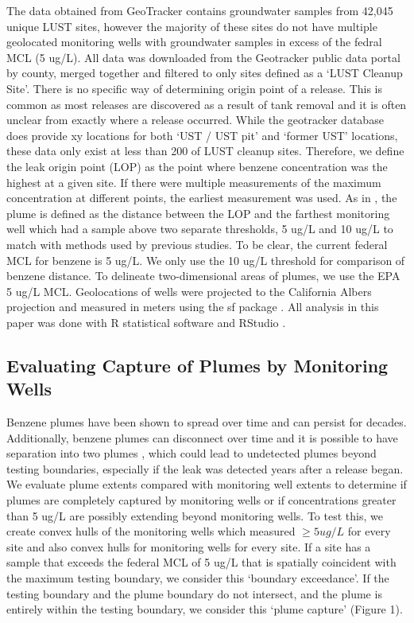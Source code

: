 \documentclass[draft,linenumbers]{agujournal2018}
\begin{document}
The data obtained from GeoTracker contains groundwater samples from
42,045 unique LUST sites, however the majority of these sites do not
have multiple geolocated monitoring wells with groundwater samples in
excess of the fedral MCL (5 ug/L). All data was downloaded from the
Geotracker public data portal \citep{geotracker} by county, merged
together and filtered to only sites defined as a `LUST Cleanup Site'.
There is no specific way of determining origin point of a release. This
is common as most releases are discovered as a result of tank removal
and it is often unclear from exactly where a release occurred. While the
geotracker database does provide xy locations for both `UST / UST pit'
and `former UST' locations, these data only exist at less than 200 of
LUST cleanup sites. Therefore, we define the leak origin point (LOP) as
the point where benzene concentration was the highest at a given site.
If there were multiple measurements of the maximum concentration at
different points, the earliest measurement was used. As in
\citet{connor2015}, the plume is defined as the distance between the LOP
and the farthest monitoring well which had a sample above two separate
thresholds, 5 ug/L and 10 ug/L to match with methods used by previous
studies. To be clear, the current federal MCL for benzene is 5 ug/L. We
only use the 10 ug/L threshold for comparison of benzene distance. To
delineate two-dimensional areas of plumes, we use the EPA 5 ug/L MCL.
Geolocations of wells were projected to the California Albers projection
and measured in meters using the sf package \citep{sf}. All analysis in
this paper was done with R statistical software \citep{R} and RStudio
\citep{RStudio}.

\subsection{Evaluating Capture of Plumes by Monitoring Wells}

Benzene plumes have been shown to spread over time and can persist for
decades. Additionally, benzene plumes can disconnect over time and it is
possible to have separation into two plumes \citep{molson2002modeling},
which could lead to undetected plumes beyond testing boundaries,
especially if the leak was detected years after a release began. We
evaluate plume extents compared with monitoring well extents to
determine if plumes are completely captured by monitoring wells or if
concentrations greater than 5 ug/L are possibly extending beyond
monitoring wells. To test this, we create convex hulls \citep{sf} of the
monitoring wells which measured \(\ge 5 ug/L\) for every site and also
convex hulls for monitoring wells for every site. If a site has a sample
that exceeds the federal MCL of 5 ug/L that is spatially coincident with
the maximum testing boundary, we consider this `boundary exceedance'. If
the testing boundary and the plume boundary do not intersect, and the
plume is entirely within the testing boundary, we consider this `plume
capture' (Figure 1).
\end{document}
